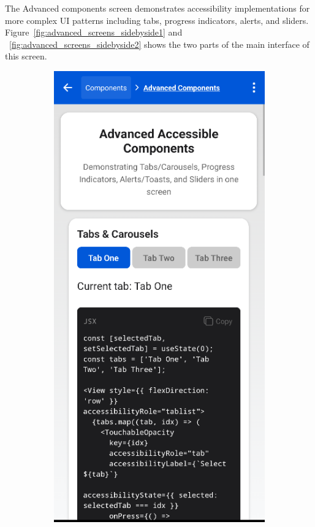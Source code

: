 The Advanced components screen demonstrates accessibility implementations for more complex UI patterns including tabs, progress indicators, alerts, and sliders. Figure~\ref{fig:advanced_screens_sidebyside1} and ~\ref{fig:advanced_screens_sidebyside2}  shows the two parts of the main interface of this screen.

\begin{figure}[ht]
    \centering
    \begin{subfigure}[b]{0.48\textwidth}
        \centering
        \includegraphics[width=\linewidth, alt={First part of the Advanced screen}]{img/advanced1.png}

\end{subfigure}
\end{figure}
